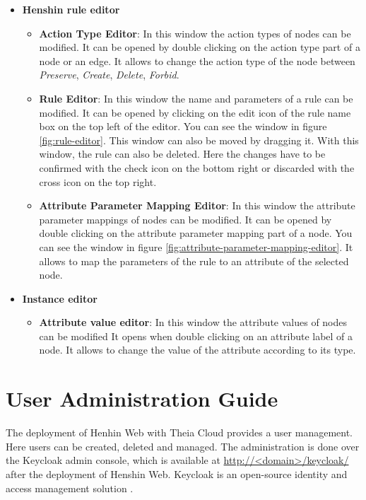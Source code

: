 \begin{itemize}
\begin{itemize}
    \end{itemize}
    \item \textbf{Henshin rule editor}
    \begin{itemize}
        \item \textbf{Action Type Editor}: In this window the action types of nodes can be modified. It can be opened by double clicking on the action type part of a node or an edge. It allows to change the action type of the node between \textit{Preserve}, \textit{Create}, \textit{Delete}, \textit{Forbid}.
        \item \textbf{Rule Editor}: In this window the name and parameters of a rule can be modified. It can be opened by clicking on the edit icon of the rule name box on the top left of the editor. You can see the window in figure \ref{fig:rule-editor}. This window can also be moved by dragging it. With this window, the rule can also be deleted. Here the changes have to be confirmed with the check icon on the bottom right or discarded with the cross icon on the top right.
        \item \textbf{Attribute Parameter Mapping Editor}: In this window the attribute parameter mappings of nodes can be modified. It can be opened by double clicking on the attribute parameter mapping part of a node. You can see the window in figure \ref{fig:attribute-parameter-mapping-editor}. It allows to map the parameters of the rule to an attribute of the selected node.
    \end{itemize}
    \item \textbf{Instance editor}
    \begin{itemize}
        \item \textbf{Attribute value editor}: In this window the attribute values of nodes can be modified It opens when double clicking on an attribute label of a node. It allows to change the value of the attribute according to its type.
    \end{itemize}
\end{itemize}

\section{User Administration Guide}
\label{sec:admin-guide}

The deployment of Henhin Web with Theia Cloud provides a user management. Here users can be created, deleted and managed. The administration is done over the Keycloak admin console, which is available at \url{http://<domain>/keycloak/} after the deployment of Henshin Web. Keycloak is an open-source identity and access management solution \cite{keycloak-repo}.

